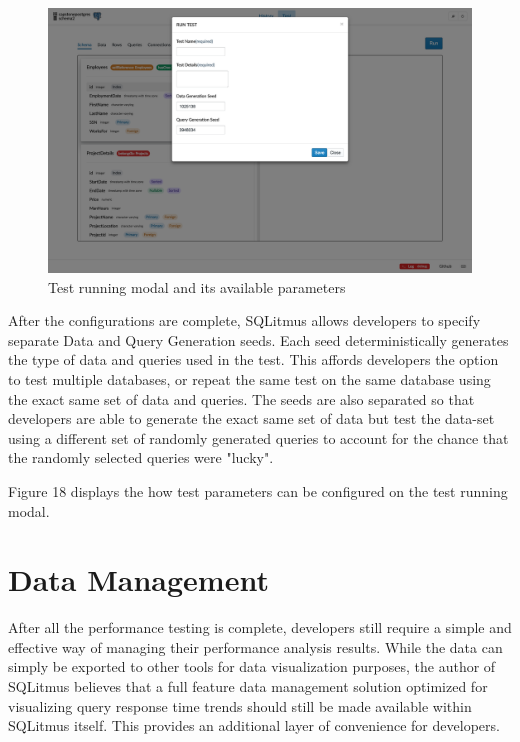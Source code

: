 \documentclass[12pt]{report}
\begin{document}
\begin{spacing}{1.9}
	\begin{figure}[H]
		\centering
		\includegraphics[width=\textwidth]{3-5.png}
		\caption{Test running modal and its available parameters}
		
	\end{figure}
	
	After the configurations are complete, SQLitmus allows developers to specify separate Data and Query Generation seeds. Each seed deterministically generates the type of data and queries used in the test. This affords developers the option to test multiple databases, or repeat the same test on the same database using the exact same set of data and queries. The seeds are also separated so that developers are able to generate the exact same set of data but test the data-set using a different set of randomly generated queries to account for the chance that the randomly selected queries were "lucky".
	
	Figure 18 displays the how test parameters can be configured on the test running modal.
	
	\section{Data Management}
	
	After all the performance testing is complete, developers still require a simple and effective way of managing their performance analysis results. While the data can simply be exported to other tools for data visualization purposes, the author of SQLitmus believes that a full feature data management solution optimized for visualizing query response time trends should still be made available within SQLitmus itself. This provides an additional layer of convenience for developers.
	

\end{spacing}
\end{document}
